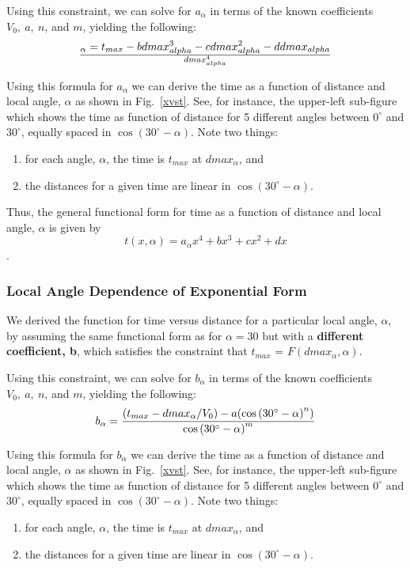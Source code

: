 \documentclass{article}
\begin{document}
Using this constraint, we can solve for $a_{\alpha}$ in terms of the known coefficients $V_0, ~a, ~n$, and $m$,
yielding the following:
\begin{equation}
\label{aalphaequation}
_{\alpha}={t_{max} - b dmax_{alpha}^3 - c dmax_{alpha}^2 - d dmax_{alpha}}\over{dmax_{alpha}^4}
\end{equation}

Using this formula for $a_{\alpha}$ we can derive the time as a function of distance and local
angle, $\alpha$ as shown in Fig.~\ref{xvst}.  See, for instance, the upper-left sub-figure 
which shows the time as function of distance for 5 different angles between $0^{\circ}$ and 
$30^{\circ}$, equally spaced in $\cos \left(30^\circ-\alpha\right)$.  Note two things:
\begin{enumerate}
\item for each angle, $\alpha$, the time is $t_{max}$ at $dmax_{\alpha}$, and
\item the distances for a given time are linear in $\cos \left(30^\circ-\alpha\right)$.
\end{enumerate}

Thus, the general functional form for time as a function of distance and local angle, $\alpha$
is given by
\begin{equation}
\label{tfunctionofxandlocalangle}
t(x,\alpha) = a_{\alpha} x^4 + b x^3 + c x^2 + d x
\end{equation}.


\subsubsection{Local Angle Dependence of Exponential Form}
We derived the function for time versus distance for a particular local angle, $\alpha$, by
assuming the same functional form as for $\alpha = 30$ but with a {\bf different coefficient, b}, which 
satisfies the constraint that $t_{max}$ = $F(dmax_{\alpha},\alpha)$.

Using this constraint, we can solve for $b_{\alpha}$ in terms of the known coefficients $V_0, ~a, ~n$, and $m$,
yielding the following:
\begin{equation}
\label{balphaequation}
b_{\alpha}={{(t_{max}-dmax_{\alpha}/V_0)-a(\cos \left(30^\circ-\alpha\right)^n)}\over{\cos \left(30^\circ-\alpha\right)^m}}
\end{equation}

Using this formula for $b_{\alpha}$ we can derive the time as a function of distance and local
angle, $\alpha$ as shown in Fig.~\ref{xvst}.  See, for instance, the upper-left sub-figure 
which shows the time as function of distance for 5 different angles between $0^{\circ}$ and 
$30^{\circ}$, equally spaced in $\cos \left(30^\circ-\alpha\right)$.  Note two things:
\begin{enumerate}
\item for each angle, $\alpha$, the time is $t_{max}$ at $dmax_{\alpha}$, and
\item the distances for a given time are linear in $\cos \left(30^\circ-\alpha\right)$.
\end{enumerate}
\end{document}
